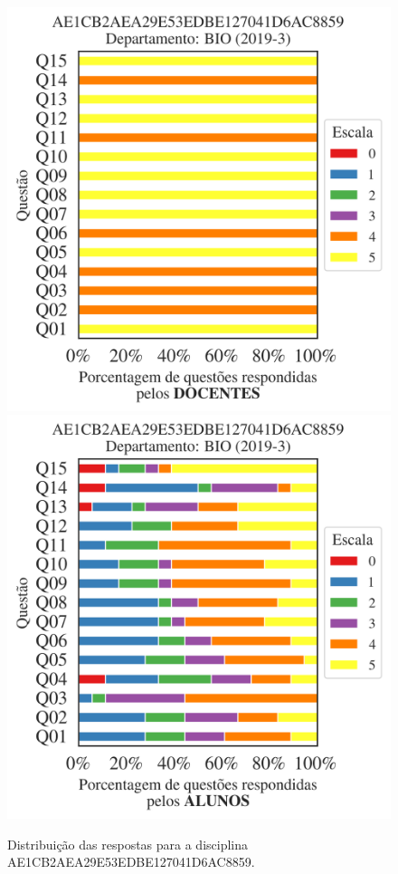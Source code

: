 \documentclass[a4paper,10pt]{article}
\begin{document}
\begin{figure}[h]
\centering
\includegraphics[width=0.485\linewidth]{analise_disciplina_departamento_BIO_AE1CB2AEA29E53EDBE127041D6AC8859_docentes.png}
\includegraphics[width=0.485\linewidth]{analise_disciplina_departamento_BIO_AE1CB2AEA29E53EDBE127041D6AC8859_alunos.png}
\caption{\label{fig:analise_geral_departamento}                Distribuição das respostas para a disciplina AE1CB2AEA29E53EDBE127041D6AC8859. }
\end{figure}
\end{document}
